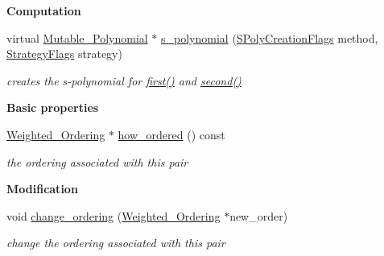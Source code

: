 \begin{Indent}\textbf{ Computation}\par
\begin{DoxyCompactItemize}
\item 
virtual \hyperlink{group__polygroup_class_mutable___polynomial}{Mutable\+\_\+\+Polynomial} $\ast$ \hyperlink{group___g_b_computation_a3146fa294ea814d5388e09b1c76c966b}{s\+\_\+polynomial} (\hyperlink{group___g_b_computation_ga73257b8a2d5cc826853a71b77d0cebf2}{S\+Poly\+Creation\+Flags} method, \hyperlink{group__strategygroup_ga0ee6c8e033547330e6b89929730007f4}{Strategy\+Flags} strategy)
\begin{DoxyCompactList}\small\item\em creates the s-\/polynomial for \hyperlink{group___g_b_computation_a6e251e3724fde2c610d921f93889eb67}{first()} and \hyperlink{group___g_b_computation_a06da1cbbe1451962b68f2bbf90855fae}{second()} \end{DoxyCompactList}\end{DoxyCompactItemize}
\end{Indent}
\begin{Indent}\textbf{ Basic properties}\par
\begin{DoxyCompactItemize}
\item 
\mbox{\label{group___g_b_computation_afbdf7f7bc0d9332c3df08858b0803aed}} 
\hyperlink{group__orderinggroup_class_weighted___ordering}{Weighted\+\_\+\+Ordering} $\ast$ \hyperlink{group___g_b_computation_afbdf7f7bc0d9332c3df08858b0803aed}{how\+\_\+ordered} () const
\begin{DoxyCompactList}\small\item\em the ordering associated with this pair \end{DoxyCompactList}\end{DoxyCompactItemize}
\end{Indent}
\begin{Indent}\textbf{ Modification}\par
\begin{DoxyCompactItemize}
\item 
void \hyperlink{group___g_b_computation_aa9001ca49b2c2fd7d39384e4e70c5a6b}{change\+\_\+ordering} (\hyperlink{group__orderinggroup_class_weighted___ordering}{Weighted\+\_\+\+Ordering} $\ast$new\+\_\+order)
\begin{DoxyCompactList}\small\item\em change the ordering associated with this pair \end{DoxyCompactList}\end{DoxyCompactItemize}
\end{Indent}
